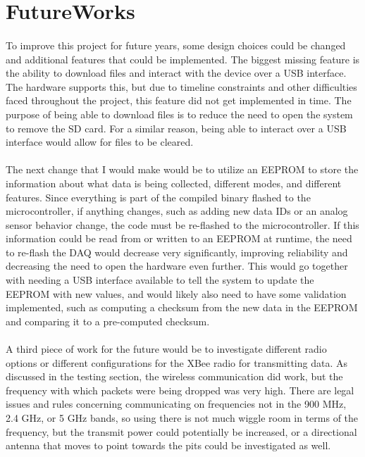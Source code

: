 \section{FutureWorks}

\paragraph{}
To improve this project for future years, some design choices could be changed and additional features that could be implemented.
The biggest missing feature is the ability to download files and interact with the device over a USB interface.
The hardware supports this, but due to timeline constraints and other difficulties faced throughout the project, this feature did not get implemented in time.
The purpose of being able to download files is to reduce the need to open the system to remove the SD card.
For a similar reason, being able to interact over a USB interface would allow for files to be cleared.

\paragraph{}
The next change that I would make would be to utilize an EEPROM to store the information about what data is being collected, different modes, and different features.
Since everything is part of the compiled binary flashed to the microcontroller, if anything changes, such as adding new data IDs or an analog sensor behavior change, the code must be re-flashed to the microcontroller.
If this information could be read from or written to an EEPROM at runtime, the need to re-flash the DAQ would decrease very significantly, improving reliability and decreasing the need to open the hardware even further.
This would go together with needing a USB interface available to tell the system to update the EEPROM with new values, and would likely also need to have some validation implemented, such as computing a checksum from the new data in the EEPROM and comparing it to a pre-computed checksum.

\paragraph{}
A third piece of work for the future would be to investigate different radio options or different configurations for the XBee radio for transmitting data.
As discussed in the testing section, the wireless communication did work, but the frequency with which packets were being dropped was very high.
There are legal issues and rules concerning communicating on frequencies not in the 900 MHz, 2.4 GHz, or 5 GHz bands, so using there is not much wiggle room in terms of the frequency, but the transmit power could potentially be increased, or a directional antenna that moves to point towards the pits could be investigated as well.

